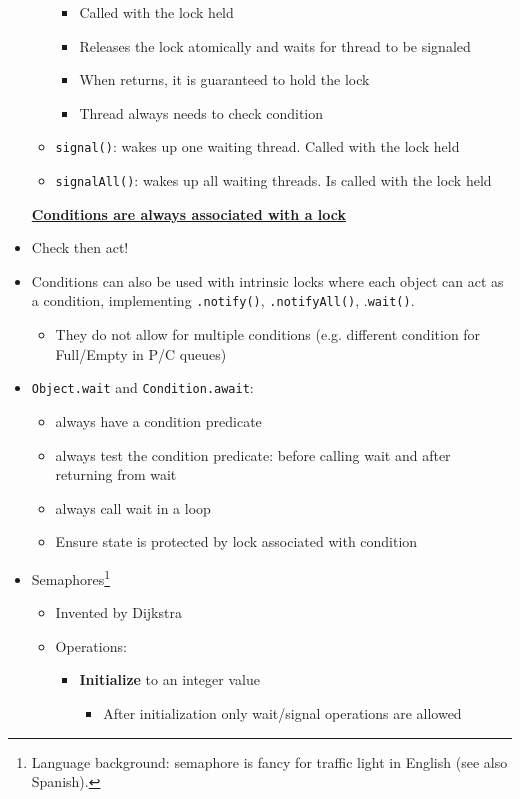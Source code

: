 \documentclass[a4paper]{article}
\newcommand{\inline}[1]{\lstinline!#1!}%
\begin{document}
\begin{itemize}
\begin{itemize}
\begin{itemize}
\item Called with the lock held
\item Releases the lock atomically and waits for thread to be signaled
\item When returns, it is guaranteed to hold the lock
\item Thread always needs to check condition
\end{itemize}
\item \inline{signal()}: wakes up one waiting thread. Called with the lock held
\item \inline{signalAll()}: wakes up all waiting threads. Is called with the lock held
\end{itemize}
\textbf{\underline{Conditions are always associated with a lock}}
\item Check then act! 
\item Conditions can also be used with intrinsic locks where each object can act as a condition, implementing \inline{.notify()}, \inline{.notifyAll()}, .\inline{wait()}. 
\begin{itemize}
\item They do not allow for multiple conditions (e.g. different condition for Full/Empty in P/C queues)
\end{itemize}
\item \inline{Object.wait} and \inline{Condition.await}: 
\begin{itemize}
\item always have a condition predicate
\item always test the condition predicate: before calling wait and after returning from wait 
\item always call wait in a loop
\item Ensure state is protected by lock associated with condition
\end{itemize}
\item Semaphores\footnote{Language background: semaphore is fancy for traffic light in English (see also Spanish).} 
\begin{itemize}
\item Invented by Dijkstra
\item Operations:
\begin{itemize}
\item \textbf{Initialize} to an integer value
\begin{itemize}
\item After initialization only wait/signal operations are allowed

\end{itemize}
\end{itemize}
\end{itemize}
\end{itemize}
\end{document}

